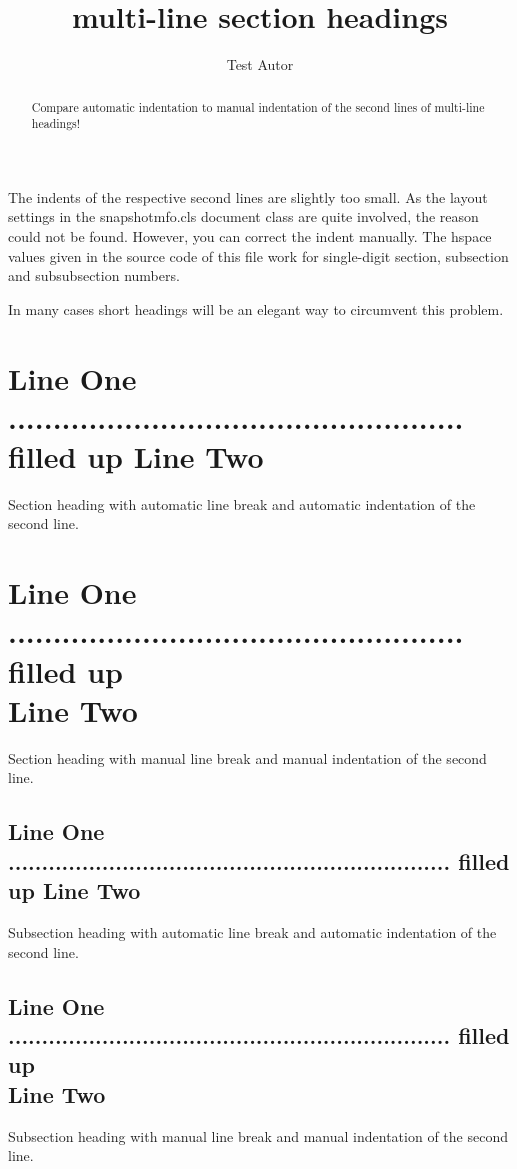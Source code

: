\documentclass{snapshotmfo}
\author{Test Autor}
\title{multi-line section headings}
\begin{document}
\begin{abstract}
Compare automatic indentation to manual indentation of the second lines of multi-line headings!\end{abstract}

The indents of the respective second lines are slightly too small. As the layout settings in the snapshotmfo.cls document class are quite involved, the reason could not be found. However, you can correct the indent manually. The hspace values given in the source code of this file work for single-digit section, subsection and subsubsection numbers.

In many cases short headings will be an elegant way to circumvent this problem. 

\section[Line One ... filled up Line Two]{Line One ................................................... filled up Line Two}
Section heading with automatic line break and automatic indentation of the second line.

\section[Line One ... filled up Line Two]{Line One ................................................... filled up\\
\hspace{12.58pt}Line Two}
Section heading with manual line break and manual indentation of the second line.

\subsection[Line One ... filled up Line Two]{Line One .................................................................. filled up Line Two}
Subsection heading with automatic line break and automatic indentation of the second line.

\subsection[Line One ... filled up Line Two]{Line One .................................................................. filled up\\
\hspace{19.8pt}Line Two}
Subsection heading with manual line break and manual indentation of the second line.
\end{document}

